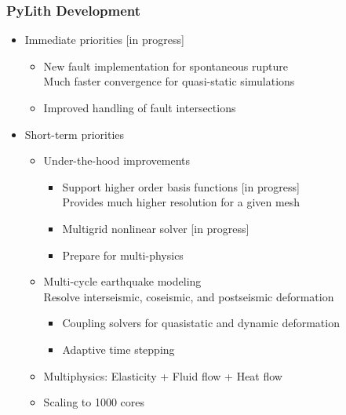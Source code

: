 \documentclass{beamer}
\newcommand{\status}[1]{{\color{blue}[#1]}}
\begin{document}
\begin{frame}
  \frametitle{PyLith Development}

  \begin{itemize}
  \item Immediate priorities \status{in progress}
    \begin{itemize}
    \item New fault implementation for spontaneous rupture\\
      Much faster convergence for quasi-static simulations
    \item Improved handling of fault intersections
    \end{itemize}
  \item Short-term priorities
    \begin{itemize}
    \item Under-the-hood improvements
      \begin{itemize}
      \item Support higher order basis functions \status{in
          progress}\\
        Provides much higher resolution for a given mesh
      \item Multigrid nonlinear solver \status{in progress}
      \item Prepare for multi-physics
      \end{itemize}
    \item Multi-cycle earthquake modeling\\
      Resolve interseismic, coseismic, and postseismic deformation
      \begin{itemize}
      \item Coupling solvers for quasistatic and dynamic deformation
      \item Adaptive time stepping
      \end{itemize}
    \item Multiphysics: Elasticity + Fluid flow + Heat flow
    \item Scaling to 1000 cores
    \end{itemize}
  \end{itemize}

\end{frame}
\end{document}
